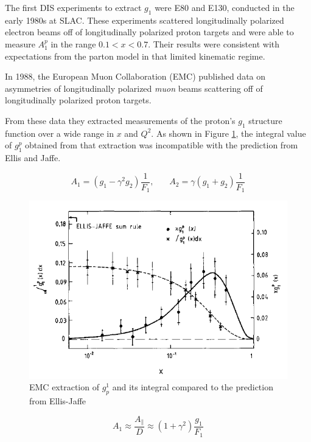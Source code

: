 The first DIS experiments to extract $g_1$ were E80 and E130, conducted in the early 1980s at SLAC.  These experiments scattered longitudinally polarized electron beams off of longitudinally polarized proton targets and were able to measure $A_1^p$ in the range $0.1 < x < 0.7$.  Their results were consistent with expectations from the parton model in that limited kinematic regime.

In 1988, the European Muon Collaboration (EMC) published data on asymmetries of longitudinally polarized \textit{muon} beams scattering off of longitudinally polarized proton targets.  

From these data they extracted measurements of the proton's $g_1$ structure function over a wide range in $x$ and $Q^2$.  As shown in Figure \ref{fig:emc-g1p}, the integral value of $g_1^p$ obtained from that extraction was incompatible with the prediction from Ellis and Jaffe.



\begin{equation}
  A_1 = (g_1 - \gamma^2 g_2)\frac{1}{F_1}, ~~~~~~~~ A_2 = \gamma(g_1+g_2)\frac{1}{F_1}
\end{equation}

\begin{figure}
  \includegraphics[width=1.0\textwidth]{figures/emc-g1p}
  \caption{EMC extraction of $g^1_p$ and its integral compared to the prediction from Ellis-Jaffe \cite{Ashman:1987hv}}
  \label{fig:emc-g1p}
\end{figure}

\begin{equation}
  A_1 \approx \frac{A_{\parallel}}{D} \approx (1 + \gamma^2)\frac{g_1}{F_1}
\end{equation}

